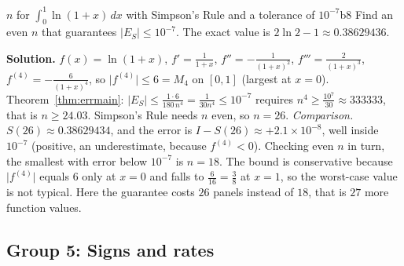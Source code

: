\documentclass[11pt]{article}
\begin{document}
\begin{exmp}{$n$ for $\int_0^1\ln(1+x)\,dx$ with Simpson's Rule and a tolerance of $10^{-7}$}{b8}
Find an even $n$ that guarantees $\lvert E_S\rvert\le10^{-7}$. The exact value is $2\ln2-1\approx0.38629436$.

\textbf{Solution.} $f(x)=\ln(1+x)$, $f'=\frac1{1+x}$, $f''=-\frac1{(1+x)^2}$, $f'''=\frac2{(1+x)^3}$, $f^{(4)}=-\frac6{(1+x)^4}$, so $\lvert f^{(4)}\rvert\le6=M_4$ on $[0,1]$ (largest at $x=0$). Theorem~\ref{thm:errmain}: $\lvert E_S\rvert\le\frac{1\cdot6}{180\,n^4}=\frac1{30n^4}\le10^{-7}$ requires $n^4\ge\frac{10^7}{30}\approx333333$, that is $n\ge24.03$. Simpson's Rule needs $n$ even, so $n=26$.
\emph{Comparison.} $S(26)\approx0.38629434$, and the error is $I-S(26)\approx+2.1\times10^{-8}$, well inside $10^{-7}$ (positive, an underestimate, because $f^{(4)}<0$). Checking even $n$ in turn, the smallest with error below $10^{-7}$ is $n=18$. The bound is conservative because $\lvert f^{(4)}\rvert$ equals $6$ only at $x=0$ and falls to $\frac6{16}=\frac38$ at $x=1$, so the worst-case value is not typical.
Here the guarantee costs $26$ panels instead of $18$, that is $27$ more function values.
\end{exmp}

\subsection*{Group 5: Signs and rates}
\end{document}
